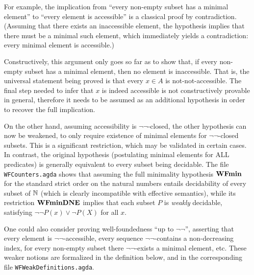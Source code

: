 For example, the implication from ``every non-empty subset has a minimal element'' to
``every element is accessible''  is a classical proof by contradiction.
(Assuming that there exists an inaccessible element, the hypothesis implies that
there must be a minimal such element, which immediately yields a contradiction:
every minimal element is accessible.)

Constructively, this argument only goes so far as to show that, if every non-empty
subset has a minimal element, then no element is inaccessible.
That is, the universal statement being proved is that every $x \in A$
is not-not-accessible. The final step needed to infer that $x$ is indeed accessible
is not constructively provable in general, therefore it needs to be assumed as
an additional hypothesis in order to recover the full implication.

On the other hand, assuming accessibility is $\lnot\lnot$-closed, the other
hypothesis can now be weakened, to only require existence of minimal elements
for $\lnot\lnot$-closed subsets.  This is a significant restriction, which may
be validated in certain cases.  In contrast, the original hypothesis
(postulating minimal elements for ALL predicates)
is generally equivalent to every subset being decidable.
The file \texttt{WFCounters.agda} shows that assuming the full minimality hypothesis $\mathbf{WFmin}$ for the standard strict order on the natural numbers entails decidability of every subset of $\mathbb{N}$ (which is clearly incompatible with effective semantics), while its restriction $\mathbf{WFminDNE}$ implies
that each subset $P$ is \emph{weakly} decidable,
satisfying $\lnot \lnot P(x) \lor \lnot P(X)$ for all $x$.

One could also consider proving well-foundedness ``up to $\lnot\lnot$'',
asserting that every element is $\lnot\lnot$-accessible,
every sequence $\lnot\lnot$-contains a non-decreasing index,
for every non-empty subset there $\lnot\lnot$-exists a minimal element, etc.
These weaker notions are formalized in the definition below, and in the corresponding file
\texttt{WFWeakDefinitions.agda}.


